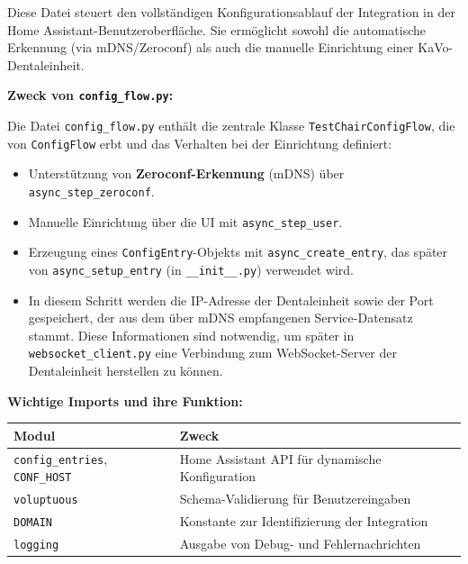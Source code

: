 Diese Datei steuert den vollständigen Konfigurationsablauf der Integration in der Home Assistant-Benutzeroberfläche. Sie ermöglicht sowohl die automatische Erkennung (via mDNS/Zeroconf) als auch die manuelle Einrichtung einer KaVo-Dentaleinheit.

\vspace{0.5cm}

\textbf{Zweck von \texttt{config\_flow.py}:}

Die Datei \texttt{config\_flow.py} enthält die zentrale Klasse \texttt{TestChairConfigFlow}, die von \texttt{ConfigFlow} erbt und das Verhalten bei der Einrichtung definiert:

\begin{itemize}
\item Unterstützung von \textbf{Zeroconf-Erkennung} (mDNS) über \texttt{async\_step\_zeroconf}.\\
\item Manuelle Einrichtung über die UI mit \texttt{async\_step\_user}.\\
\item Erzeugung eines \texttt{ConfigEntry}-Objekts mit \texttt{async\_create\_entry}, das später von \texttt{async\_setup\_entry} (in \texttt{\_\_init\_\_.py}) verwendet wird.\\
\item In diesem Schritt werden die IP-Adresse der Dentaleinheit sowie der Port gespeichert, der aus dem über mDNS empfangenen Service-Datensatz stammt. Diese Informationen sind notwendig, um später in \texttt{websocket\_client.py} eine Verbindung zum WebSocket-Server der Dentaleinheit herstellen zu können.

\end{itemize}

\vspace{0.5cm}

\textbf{Wichtige Imports und ihre Funktion:}

\begin{tabular}{|p{5.5cm}|p{8.5cm}|}
\hline
\textbf{Modul} & \textbf{Zweck} \\
\hline
\texttt{config\_entries}, \texttt{CONF\_HOST} & Home Assistant API für dynamische Konfiguration \\
\texttt{voluptuous} & Schema-Validierung für Benutzereingaben \\
\texttt{DOMAIN} & Konstante zur Identifizierung der Integration \\
\texttt{logging} & Ausgabe von Debug- und Fehlernachrichten \\
\hline
\end{tabular}

